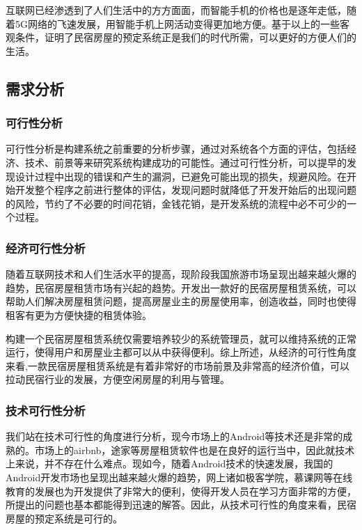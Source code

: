 \documentclass[lang=cn,11pt,a4paper,cite=authoryear]{elegantpaper}
\begin{document}
互联网已经渗透到了人们生活中的方方面面，而智能手机的价格也是逐年走低，随着5G网络的飞速发展，用智能手机上网活动变得更加地方便。基于以上的一些客观条件，证明了民宿房屋的预定系统正是我们的时代所需，可以更好的方便人们的生活。

\subsection{需求分析}

\subsubsection{可行性分析}

可行性分析是构建系统之前重要的分析步骤，通过对系统各个方面的评估，包括经济、技术、前景等来研究系统构建成功的可能性。通过可行性分析，可以提早的发现设计过程中出现的错误和产生的漏洞，已避免可能出现的损失，规避风险。在开始开发整个程序之前进行整体的评估，发现问题时就降低了开发开始后的出现问题的风险，节约了不必要的时间花销，金钱花销，是开发系统的流程中必不可少的一个过程。

\subsubsection{经济可行性分析}

随着互联网技术和人们生活水平的提高，现阶段我国旅游市场呈现出越来越火爆的趋势，民宿房屋租赁市场有兴起的趋势。开发出一款好的民宿房屋租赁系统，可以帮助人们解决房屋租赁问题，提高房屋业主的房屋使用率，创造收益，同时也使得租客有更为方便快捷的租赁体验。

构建一个民宿房屋租赁系统仅需要培养较少的系统管理员，就可以维持系统的正常运行，使得用户和房屋业主都可以从中获得便利。综上所述，从经济的可行性角度来看,一款民宿房屋租赁系统是有着非常好的市场前景及非常高的经济价值，可以拉动民宿行业的发展，方便空闲房屋的利用与管理。

\subsubsection{技术可行性分析}

我们站在技术可行性的角度进行分析，现今市场上的Android等技术还是非常的成熟的。市场上的airbnb，途家等房屋租赁软件也是在良好的运行当中，因此就技术上来说，并不存在什么难点。现如今，随着Android技术的快速发展，我国的Android开发市场也呈现出越来越火爆的趋势，网上诸如极客学院，慕课网等在线教育的发展也为开发提供了非常大的便利，使得开发人员在学习方面非常的方便，所提出的问题也基本都能得到迅速的解答。因此，从技术可行性的角度来看，民宿房屋的预定系统是可行的。
\end{document}
